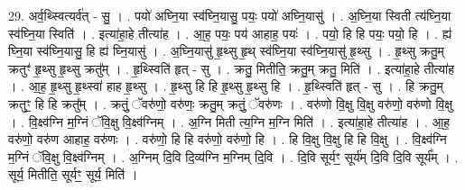 \documentclass[17pt]{extarticle}
\begin{document}
29. अर्व॒थ्स्वित्यर्व॑त् - सु॒ । . पयो॑ अघ्नि॒या स्व॑घ्नि॒यासु॒ पयः॒ पयो॑ अघ्नि॒यासु॑ । . अ॒घ्नि॒या स्विती त्य॑घ्नि॒या स्व॑घ्नि॒या स्विति॑ । . इत्या॑हा॒हे तीत्या॑ह । . आ॒ह॒ पयः॒ पय॑ आहाह॒ पयः॑ । . पयो॒ हि हि पयः॒ पयो॒ हि । . ह्य॑ घ्नि॒या स्व॑घ्नि॒यासु॒ हि ह्य॑ घ्नि॒यासु॑ । . अ॒घ्नि॒यासु॑ हृ॒थ्सु हृ॒थ् स्व॑घ्नि॒या स्व॑घ्नि॒यासु॑ हृ॒थ्सु । . हृ॒थ्सु क्रतु॒म् क्रतुꣳ॑ हृ॒थ्सु हृ॒थ्सु क्रतु᳚म् । . हृ॒थ्स्विति॑ हृत् - सु । . क्रतु॒ मितीति॒ क्रतु॒म् क्रतु॒ मिति॑ । . इत्या॑हा॒हे तीत्या॑ह । . आ॒ह॒ हृ॒थ्सु हृ॒थ्स्वा॑ हाह हृ॒थ्सु । . हृ॒थ्सु हि हि हृ॒थ्सु हृ॒थ्सु हि । . हृ॒थ्स्विति॑ हृत् - सु । . हि क्रतु॒म् क्रतुꣳ॒॒ हि हि क्रतु᳚म् । . क्रतुं॒ ॅवरु॑णो॒ वरु॑णः॒ क्रतु॒म् क्रतुं॒ ॅवरु॑णः । . वरु॑णो वि॒क्षु वि॒क्षु वरु॑णो॒ वरु॑णो वि॒क्षु । . वि॒क्ष्व॑ग्नि म॒ग्निं ॅवि॒क्षु वि॒क्ष्व॑ग्निम् । . अ॒ग्नि मिती त्य॒ग्नि म॒ग्नि मिति॑ । . इत्या॑हा॒हे तीत्या॑ह । . आ॒ह॒ वरु॑णो॒ वरु॑ण आहाह॒ वरु॑णः । . वरु॑णो॒ हि हि वरु॑णो॒ वरु॑णो॒ हि । . हि वि॒क्षु वि॒क्षु हि हि वि॒क्षु । . वि॒क्ष्व॑ग्नि म॒ग्निं ॅवि॒क्षु वि॒क्ष्व॑ग्निम् । . अ॒ग्निम् दि॒वि दि॒व्य॑ग्नि म॒ग्निम् दि॒वि । . दि॒वि सूर्यꣳ॒॒ सूर्य॑म् दि॒वि दि॒वि सूर्य᳚म् । . सूर्य॒ मितीति॒ सूर्यꣳ॒॒ सूर्य॒ मिति॑ । \newline
\end{document}
